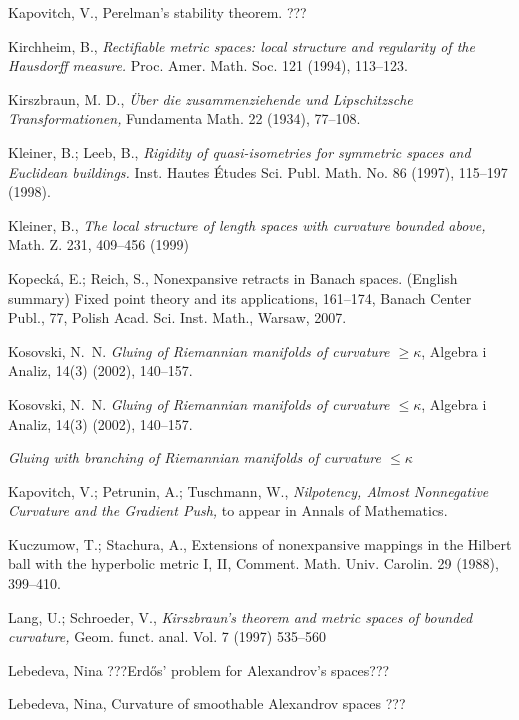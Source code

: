 \begin{thebibliography}{52}
 Kapovitch, V.,  Perelman's stability theorem. ???

 Kirchheim, B.,  \textit{Rectifiable metric spaces: local structure and regularity of the Hausdorff measure.} Proc. Amer. Math. Soc. 121 (1994), 113--123.

 Kirszbraun, M. D., \textit{\"Uber die zusammenziehende und Lipschitzsche Transformationen,} Fundamenta Math. 22 (1934), 77--108.

  Kleiner, B.; Leeb, B., \textit{Rigidity of quasi-isometries for symmetric spaces and Euclidean buildings.} Inst. Hautes \'Etudes Sci. Publ. Math. No. 86 (1997), 115--197 (1998).

 Kleiner, B.,  \textit{The local structure of length spaces
with curvature bounded above,} Math. Z. 231, 409--456 (1999)

Kopeck\'a, E.; Reich, S.,
Nonexpansive retracts in Banach spaces. (English summary) Fixed point theory and its applications, 161--174, 
Banach Center Publ., 77, Polish Acad. Sci. Inst. Math., Warsaw, 2007. 

Kosovski, N.~N. 
\textit{Gluing of Riemannian manifolds of curvature $\geq \kappa$}, Algebra i Analiz, 14(3) (2002), 140--157.

Kosovski, N.~N. 
\textit{Gluing of Riemannian manifolds of curvature $\leq \kappa$}, Algebra i Analiz, 14(3) (2002), 140--157.

\textit{Gluing with branching of {R}iemannian manifolds of curvature $\leq \kappa$}

 Kapovitch, V.; Petrunin, A.; Tuschmann, W.,  \textit{Nilpotency, Almost Nonnegative Curvature and the Gradient Push,} to appear in Annals of Mathematics.

 Kuczumow, T.; Stachura, A., Extensions of nonexpansive mappings in
the Hilbert ball with the hyperbolic metric I, II, Comment. Math. Univ.
Carolin. 29 (1988), 399--410.

  Lang, U.; Schroeder, V., \textit{Kirszbraun's theorem and metric spaces of bounded curvature,} Geom. funct. anal.
Vol. 7 (1997) 535--560

 Lebedeva, Nina ???Erd\H{o}s' problem for Alexandrov's spaces???

 Lebedeva, Nina, Curvature of smoothable Alexandrov spaces ??? 


\end{thebibliography}
